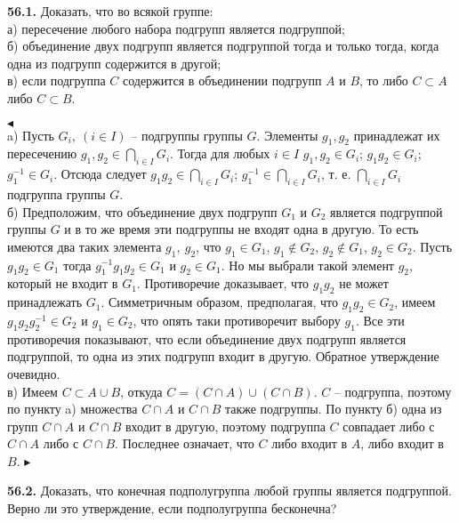 \documentclass[a5paper,10pt]{article}
\begin{document}

\bigskip
\noindent
{\bf 56.1.} Доказать, что во всякой группе:\\
а) пересечение любого набора подгрупп является подгруппой;\\
б) объединение двух подгрупп является подгруппой тогда и только тогда, когда одна из подгрупп содержится в другой;\\
в) если подгруппа $C$ содержится в объединении подгрупп $A$ и $B$, то либо $C\subset A$ либо $C\subset B$. 

\medskip
\noindent
$\blacktriangleleft$\\
a) Пусть $G_i,\ (i\in I)$ -- подгруппы группы $G$. Элементы $g_1,g_2$ принадлежат их пересечению   $\displaystyle g_1,g_2\in \bigcap_{i\in I} G_i$. Тогда для любых $i\in I$ $g_1,g_2\in G_i$; $g_1g_2\in G_i$; $g_1^{-1}\in G_i$. Отсюда следует $\displaystyle g_1g_2\in \bigcap_{i\in I} G_i$; $\displaystyle g_1^{-1}\in \bigcap_{i\in I} G_i$, т. е. $\displaystyle \bigcap_{i\in I} G_i$ подгруппа группы $G$.\\
б) Предположим, что объединение двух подгрупп $G_1$ и $G_2$ является подгруппой группы $G$ и в то же время эти подгруппы не входят одна в другую. То есть имеются два таких элемента $g_1,\ g_2$, что $g_1\in G_1$, $g_1\notin G_2$, $g_2\notin G_1$, $g_2\in G_2$. Пусть $g_1g_2\in G_1$ тогда $g_1^{-1}g_1g_2\in G_1$ и $g_2\in G_1$. Но мы выбрали такой элемент $g_2$, который не входит в $G_1$. Противоречие доказывает, что $g_1g_2$ не может принадлежать $G_1$. Симметричным образом, предполагая, что $g_1g_2\in G_2$, имеем $g_1g_2g_2^{-1}\in G_2$ и $g_1\in G_2$, что опять таки противоречит выбору $g_1$. Все эти противоречия показывают, что если объединение двух подгрупп является подгруппой, то одна из этих подгрупп входит в другую. Обратное утверждение очевидно.\\
в) Имеем $C\subset A\cup B$, откуда $C=(C\cap A)\cup (C\cap B)$. $C$ -- подгруппа, поэтому по пункту a) множества $C\cap A$ и $C\cap B$ также подгруппы. По пункту б) одна из групп $C\cap A$ и $C\cap B$ входит в другую, поэтому подгруппа $C$ совпадает либо с $C\cap A$ либо с $C\cap B$. Последнее означает, что $C$ либо входит в $A$, либо входит в $B$.
$\blacktriangleright$

\bigskip
\noindent
{\bf 56.2.} Доказать, что конечная подполугруппа любой группы является подгруппой. Верно ли это утверждение, если подполугруппа бесконечна? 
\end{document}
